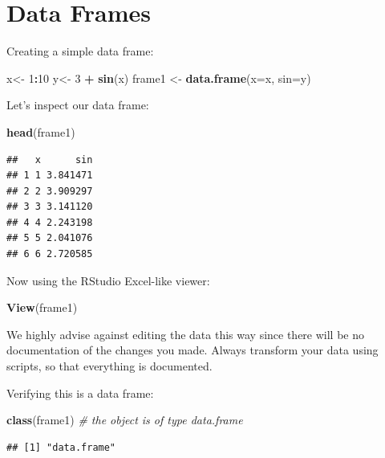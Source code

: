 \documentclass[]{book}
\newenvironment{Shaded}{\begin{snugshade}}{\end{snugshade}}
\newcommand{\KeywordTok}[1]{\textcolor[rgb]{0.13,0.29,0.53}{\textbf{#1}}}
\newcommand{\DataTypeTok}[1]{\textcolor[rgb]{0.13,0.29,0.53}{#1}}
\newcommand{\DecValTok}[1]{\textcolor[rgb]{0.00,0.00,0.81}{#1}}
\newcommand{\StringTok}[1]{\textcolor[rgb]{0.31,0.60,0.02}{#1}}
\newcommand{\CommentTok}[1]{\textcolor[rgb]{0.56,0.35,0.01}{\textit{#1}}}
\newcommand{\OperatorTok}[1]{\textcolor[rgb]{0.81,0.36,0.00}{\textbf{#1}}}
\newcommand{\NormalTok}[1]{#1}
\theoremstyle{definition}
\theoremstyle{definition}
\theoremstyle{definition}
\theoremstyle{remark}
\begin{document}
\section{Data Frames}\label{data-frames}

Creating a simple data frame:

\begin{Shaded}
\begin{Highlighting}[]
\NormalTok{x<-}\StringTok{ }\DecValTok{1}\OperatorTok{:}\DecValTok{10}
\NormalTok{y<-}\StringTok{ }\DecValTok{3} \OperatorTok{+}\StringTok{ }\KeywordTok{sin}\NormalTok{(x) }
\NormalTok{frame1 <-}\StringTok{ }\KeywordTok{data.frame}\NormalTok{(}\DataTypeTok{x=}\NormalTok{x, }\DataTypeTok{sin=}\NormalTok{y)    }
\end{Highlighting}
\end{Shaded}

Let's inspect our data frame:

\begin{Shaded}
\begin{Highlighting}[]
\KeywordTok{head}\NormalTok{(frame1)}
\end{Highlighting}
\end{Shaded}

\begin{verbatim}
##   x      sin
## 1 1 3.841471
## 2 2 3.909297
## 3 3 3.141120
## 4 4 2.243198
## 5 5 2.041076
## 6 6 2.720585
\end{verbatim}

Now using the RStudio Excel-like viewer:

\begin{Shaded}
\begin{Highlighting}[]
\KeywordTok{View}\NormalTok{(frame1) }
\end{Highlighting}
\end{Shaded}

We highly advise against editing the data this way since there will be
no documentation of the changes you made. Always transform your data
using scripts, so that everything is documented.

Verifying this is a data frame:

\begin{Shaded}
\begin{Highlighting}[]
\KeywordTok{class}\NormalTok{(frame1) }\CommentTok{# the object is of type data.frame}
\end{Highlighting}
\end{Shaded}

\begin{verbatim}
## [1] "data.frame"
\end{verbatim}
\end{document}
